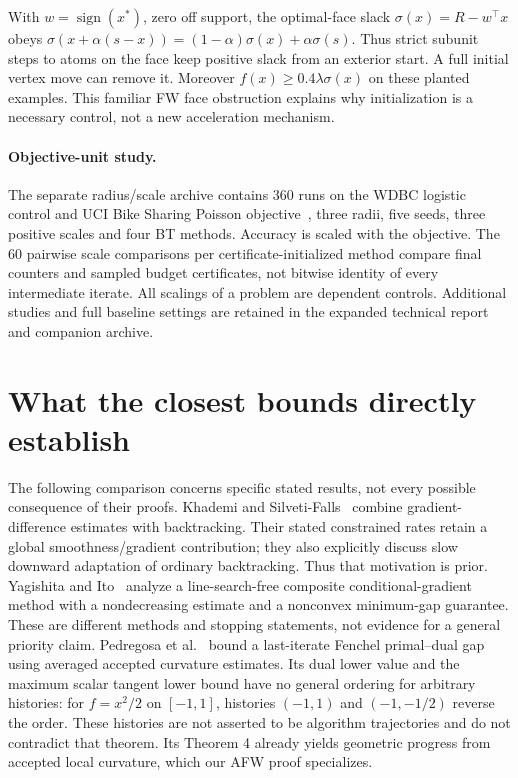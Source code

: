 With $w=\operatorname{sign}(x^*)$, zero off support, the optimal-face
slack $\sigma(x)=R-w^\top x$ obeys
$\sigma(x+\alpha(s-x))=(1-\alpha)\sigma(x)+\alpha\sigma(s)$.
Thus strict subunit steps to atoms on the face keep positive slack
from an exterior start. A full initial vertex move can remove it.
Moreover $f(x)\ge0.4\lambda\sigma(x)$ on these planted examples.
This familiar FW face obstruction explains why initialization is a
necessary control, not a new acceleration mechanism.

\paragraph{Objective-unit study.}
The separate radius/scale archive contains 360 runs on the WDBC
logistic control and UCI Bike Sharing Poisson objective~\cite{wdbc,bike},
three radii, five seeds, three positive scales
and four BT methods. Accuracy is scaled with the objective.
The 60 pairwise scale comparisons per certificate-initialized method
compare final counters and sampled budget certificates, not bitwise
identity of every intermediate iterate. All scalings of a problem
are dependent controls. Additional studies and full baseline settings
are retained in the expanded technical report and companion archive.



\section{What the closest bounds directly establish}
\label{app:comparison}
The following comparison concerns specific stated results, not every
possible consequence of their proofs.
Khademi and Silveti-Falls~\cite[Theorems 4.4--4.5]{khademi}
combine gradient-difference estimates with backtracking. Their stated
constrained rates retain a global smoothness/gradient contribution;
they also explicitly discuss slow downward adaptation of ordinary
backtracking. Thus that motivation is prior. Yagishita and
Ito~\cite[Algorithm 3, Theorem 3.1]{yagishita} analyze a line-search-free
composite conditional-gradient method with a nondecreasing estimate
and a nonconvex minimum-gap guarantee. These are different methods
and stopping statements, not evidence for a general priority claim.
Pedregosa et al.~\cite[Theorem 3]{pedregosa} bound a last-iterate
Fenchel primal--dual gap using averaged accepted curvature estimates.
Its dual lower value and the maximum scalar tangent lower bound have
no general ordering for arbitrary histories: for $f=x^2/2$ on
$[-1,1]$, histories $(-1,1)$ and $(-1,-1/2)$ reverse the order.
These histories are not asserted to be algorithm trajectories and do
not contradict that theorem. Its Theorem 4 already yields geometric
progress from accepted local curvature, which our AFW proof specializes.

